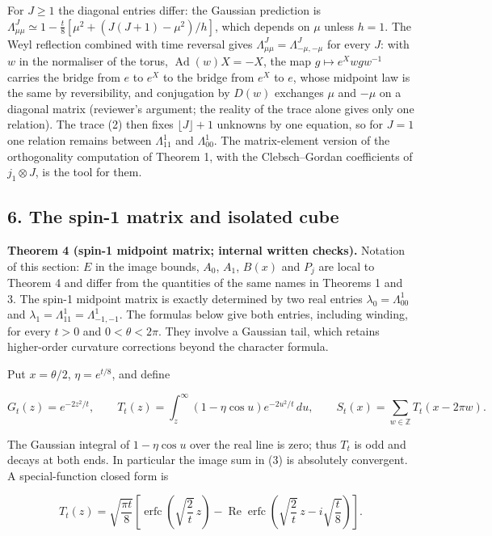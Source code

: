 \documentclass[11pt,a4paper]{article}
\begin{document}
For \(J\ge1\) the diagonal entries differ: the Gaussian prediction is
\(\Lambda^J_{\mu\mu}\simeq1-\frac t8[\mu^2+(J(J+1)-\mu^2)/h]\), which
depends on \(\mu\) unless \(h=1\). The Weyl reflection combined with
time reversal gives \(\Lambda^J_{\mu\mu}=\Lambda^J_{-\mu,-\mu}\) for
every \(J\): with \(w\) in the normaliser of the torus,
\(\operatorname{Ad}(w)X=-X\), the map \(g\mapsto e^Xwgw^{-1}\) carries
the bridge from \(e\) to \(e^X\) to the bridge from \(e^X\) to \(e\),
whose midpoint law is the same by reversibility, and conjugation by
\(D(w)\) exchanges \(\mu\) and \(-\mu\) on a diagonal matrix (reviewer's
argument; the reality of the trace alone gives only one relation). The
trace (2) then fixes \(\lfloor J\rfloor+1\) unknowns by one equation, so
for \(J=1\) one relation remains between \(\Lambda^1_{11}\) and
\(\Lambda^1_{00}\). The matrix-element version of the orthogonality
computation of Theorem 1, with the Clebsch--Gordan coefficients of
\(j_1\otimes J\), is the tool for them.

\hypertarget{the-spin-1-matrix-and-isolated-cube}{%
\subsection{6. The spin-1 matrix and isolated
cube}\label{the-spin-1-matrix-and-isolated-cube}}

\textbf{Theorem 4 (spin-1 midpoint matrix; internal written checks).}
Notation of this section: \(E\) in the image bounds, \(A_0\), \(A_1\),
\(B(x)\) and \(P_j\) are local to Theorem 4 and differ from the
quantities of the same names in Theorems 1 and 3. The spin-1 midpoint
matrix is exactly determined by two real entries
\(\lambda_0=\Lambda^1_{00}\) and
\(\lambda_1=\Lambda^1_{11}=\Lambda^1_{-1,-1}\). The formulas below give
both entries, including winding, for every \(t>0\) and
\(0<\theta<2\pi\). They involve a Gaussian tail, which retains
higher-order curvature corrections beyond the character formula.

Put \(x=\theta/2\), \(\eta=e^{t/8}\), and define

\[G_t(z)=e^{-2z^2/t},\qquad
T_t(z)=\int_z^\infty(1-\eta\cos u)e^{-2u^2/t}\,du,
\qquad S_t(x)=\sum_{w\in\mathbb Z}T_t(x-2\pi w). \tag{3}\]

The Gaussian integral of \(1-\eta\cos u\) over the real line is zero;
thus \(T_t\) is odd and decays at both ends. In particular the image sum
in (3) is absolutely convergent. A special-function closed form is

\[T_t(z)=\sqrt{\frac{\pi t}{8}}\left[
\operatorname{erfc}\!\left(\sqrt{\frac2t}\,z\right)
-\operatorname{Re}\operatorname{erfc}\!\left(
\sqrt{\frac2t}\,z-i\sqrt{\frac t8}\right)\right]. \tag{4}\]
\end{document}
